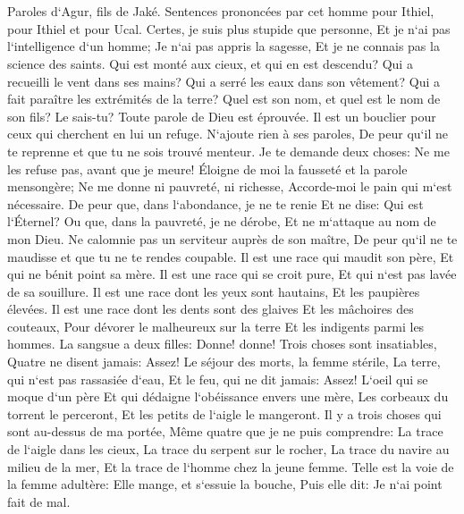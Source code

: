 \chapter{}

\verse Paroles d`Agur, fils de Jaké. Sentences prononcées par cet homme pour Ithiel, pour Ithiel et pour Ucal. 
\verse Certes, je suis plus stupide que personne, Et je n`ai pas l`intelligence d`un homme; 
\verse Je n`ai pas appris la sagesse, Et je ne connais pas la science des saints. 
\verse Qui est monté aux cieux, et qui en est descendu? Qui a recueilli le vent dans ses mains? Qui a serré les eaux dans son vêtement? Qui a fait paraître les extrémités de la terre? Quel est son nom, et quel est le nom de son fils? Le sais-tu? 
\verse Toute parole de Dieu est éprouvée. Il est un bouclier pour ceux qui cherchent en lui un refuge. 
\verse N`ajoute rien à ses paroles, De peur qu`il ne te reprenne et que tu ne sois trouvé menteur. 
\verse Je te demande deux choses: Ne me les refuse pas, avant que je meure! 
\verse Éloigne de moi la fausseté et la parole mensongère; Ne me donne ni pauvreté, ni richesse, Accorde-moi le pain qui m`est nécessaire. 
\verse De peur que, dans l`abondance, je ne te renie Et ne dise: Qui est l`Éternel? Ou que, dans la pauvreté, je ne dérobe, Et ne m`attaque au nom de mon Dieu. 
\verse Ne calomnie pas un serviteur auprès de son maître, De peur qu`il ne te maudisse et que tu ne te rendes coupable. 
\verse Il est une race qui maudit son père, Et qui ne bénit point sa mère. 
\verse Il est une race qui se croit pure, Et qui n`est pas lavée de sa souillure. 
\verse Il est une race dont les yeux sont hautains, Et les paupières élevées. 
\verse Il est une race dont les dents sont des glaives Et les mâchoires des couteaux, Pour dévorer le malheureux sur la terre Et les indigents parmi les hommes. 
\verse La sangsue a deux filles: Donne! donne! Trois choses sont insatiables, Quatre ne disent jamais: Assez! 
\verse Le séjour des morts, la femme stérile, La terre, qui n`est pas rassasiée d`eau, Et le feu, qui ne dit jamais: Assez! 
\verse L`oeil qui se moque d`un père Et qui dédaigne l`obéissance envers une mère, Les corbeaux du torrent le perceront, Et les petits de l`aigle le mangeront. 
\verse Il y a trois choses qui sont au-dessus de ma portée, Même quatre que je ne puis comprendre: 
\verse La trace de l`aigle dans les cieux, La trace du serpent sur le rocher, La trace du navire au milieu de la mer, Et la trace de l`homme chez la jeune femme. 
\verse Telle est la voie de la femme adultère: Elle mange, et s`essuie la bouche, Puis elle dit: Je n`ai point fait de mal. 
